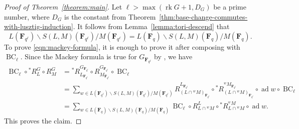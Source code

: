 \documentclass[11pt,reqno]{amsart}
\theoremstyle{definition}
\newcommand{\F}{{\mathbf F}}
\DeclareMathOperator{\ad}{ad}
\DeclareMathOperator{\BC}{BC}
\DeclareMathOperator{\rk}{rk}
\begin{document}
\begin{proof}[Proof of Theorem~\ref{theorem:main}]
    Let $\ell > \max(\rk G + 1, D_G)$ be a prime number, where $D_G$ is the constant from Theorem~\ref{thm:base-change-commutes-with-lusztig-induction}. It follows from Lemma~\ref{lemma:tori-descend} that
    \[
    L(\F_{q^\ell})\backslash S(L,M)(\F_{q^\ell})/M(\F_{q^\ell}) = L(\F_q)\backslash S(L,M)(\F_q)/M(\F_q).
    \]
    To prove \eqref{eqn:mackey-formula}, it is enough to prove it after composing with $\BC_\ell$. Since the Mackey formula is true for $G_{\F_{q^\ell}}$ by \cite[Th\'eor\`eme 5.1.1]{Bon98}, we have
    \begin{align*}
        \BC_\ell \circ {}^*R^G_L \circ R_M^G &= {}^*R^{G_{\F_{q^\ell}}}_{L_{\F_{q^\ell}}} \circ R_{M_{\F_{q^\ell}}}^{G_{\F_{q^\ell}}} \circ \BC_\ell \\
            &= \sum_{w \in L(\F_{q^\ell})\backslash S(L,M)(\F_{q^\ell})/M(\F_{q^\ell})} R_{(L\cap {}^wM)_{\F_{q^\ell}}}^{L_{\F_{q^\ell}}} \circ {}^*R^{^wM_{\F_{q^\ell}}}_{(L\cap {}^wM)_{\F_{q^\ell}}} \circ \ad w \circ \BC_\ell \\
            &= \sum_{w \in L(\F_q)\backslash S(L,M)(\F_q)/M(\F_q)} \BC_\ell \circ R_{L\cap{}^wM}^L \circ {}^*R^{^wM}_{L \cap {}^wM} \circ \ad w.
    \end{align*}
    This proves the claim.
\end{proof}









































\end{document}
